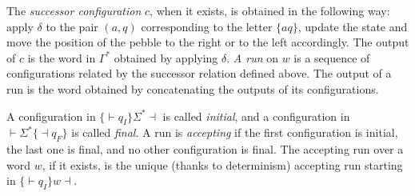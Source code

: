\documentclass{article}
\theoremstyle{definition}
\theoremstyle{remark}
\begin{document}
\begin{center}


\end{center}

The \emph{successor configuration} $c$, when it exists, is obtained in the following way: apply $\delta$ to the pair $(a,q)$ corresponding to the letter $\{aq\}$, update the state and move the position of the pebble to the right or to the left accordingly.
The output of $c$ is the word in $\Gamma^*$ obtained by applying $\delta$.
\emph{A run} on $w$ is a sequence of configurations related by the successor relation defined above. The output of a run is the word obtained by concatenating the outputs of its configurations.

A configuration in $\{{\vdash}q_I\}\Sigma^*{\dashv}$ is called \emph{initial}, and a configuration in ${\vdash}\Sigma^*\{{\dashv}q_F\}$ is called \emph{final}. A run is \emph{accepting} if the first configuration is initial, the last one is final, and no other configuration is final. The accepting run over a word $w$, if it exists, is the unique (thanks to determinism) accepting run starting in $\{{\vdash}q_I\}w{\dashv}$.
\end{document}
